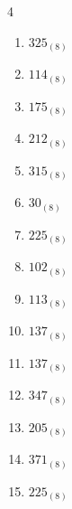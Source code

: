 \begin{multicols}{4}
\begin{enumerate}
        \phantom{$=106$}

  \item $325_{(8)}$

        \phantom{$=213$}

  \item $114_{(8)}$

        \phantom{$=76$}

  \item $175_{(8)}$

        \phantom{$=125$}

  \item $212_{(8)}$

        \phantom{$=138$}

  \item $315_{(8)}$

        \phantom{$=205$}

  \item $30_{(8)}$

        \phantom{$=24$}

\columnbreak %

  \item $225_{(8)}$

        \phantom{$=149$}

  \item $102_{(8)}$

        \phantom{$=66$}

  \item $113_{(8)}$

        \phantom{$=75$}

  \item $137_{(8)}$

        \phantom{$=95$}

  \item $137_{(8)}$

        \phantom{$=95$}

  \item $347_{(8)}$

        \phantom{$=231$}

  \item $205_{(8)}$

        \phantom{$=133$}

  \item $371_{(8)}$

        \phantom{$=249$}

  \item $225_{(8)}$

        \phantom{$=149$}


\end{enumerate}
\end{multicols}
